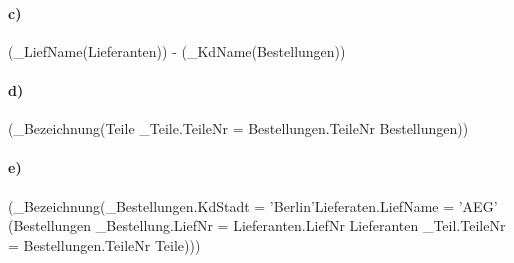 \documentclass{article}
\begin{document}
\paragraph{c)} (\pi_{LiefName}(Lieferanten)) - (\pi_{KdName}(Bestellungen))

\paragraph{d)}(\pi_{Bezeichnung}(Teile \bowtie_{Teile.TeileNr = Bestellungen.TeileNr} Bestellungen))

\paragraph{e)} (\pi_{Bezeichnung}(\sigma_{Bestellungen.KdStadt = 'Berlin'\wedge Lieferaten.LiefName = 'AEG'}\\(Bestellungen \bowtie_{Bestellung.LiefNr = Lieferanten.LiefNr} Lieferanten \bowtie_{Teil.TeileNr = Bestellungen.TeileNr} Teile)))
\end{document}
